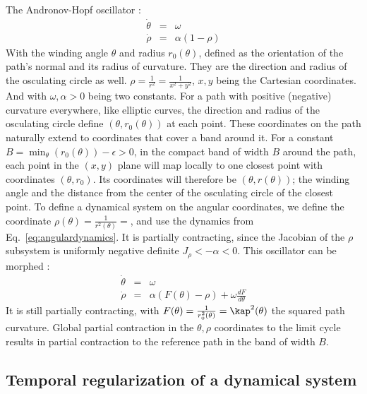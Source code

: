 The Andronov-Hopf oscillator \cite{park2009design}:
\begin{eqnarray}
\label{eq:angulardynamics}
\dot{\theta} &=& \omega\\ \nonumber
\dot{\rho} &=& \alpha(1-\rho)
\end{eqnarray}
With the winding angle $\theta$ and radius $r_0(\theta)$, defined as the orientation of the path's normal and its radius of curvature.
They are the direction and radius of the osculating circle as well.
$\rho=\frac{1}{r^2}=\frac{1}{x^2+y^2}$, $x,y$ being the Cartesian coordinates.
And with $\omega,\alpha>0$ being two constants.
For a path with positive (negative) curvature everywhere, like elliptic curves, the direction and radius of the osculating circle define $(\theta,r_0(\theta))$ at each point.
These coordinates on the path naturally extend to coordinates that cover a band around it.
For a constant $B = \min_\theta(r_0(\theta))-\epsilon>0$, in the compact band of width $B$ around the path, each point in the $(x,y)$ plane will map locally to one closest point with coordinates $(\theta,r_0)$.
Its coordinates will therefore be $(\theta,r(\theta))$; the winding angle and the distance from the center of the osculating circle of the closest point. 
To define a dynamical system on the angular coordinates, we define the coordinate $\rho(\theta) = \frac{1}{r^2(\theta)}=$, and use the dynamics from Eq.~\ref{eq:angulardynamics}.
It is partially contracting, since the Jacobian of the $\rho$ subsystem is uniformly negative definite $J_\rho<-\alpha<0$. 
This oscillator can be morphed \cite{ajallooeian_general_2013}:
\begin{eqnarray}
\label{eq:polarmorphingdynamics}
\dot{\theta} &=& \omega\\ \nonumber
\dot{\rho} &=& \alpha (F(\theta)-\rho) + \omega \frac{d F}{d \theta}
\end{eqnarray}
It is still partially contracting, with $F(\theta) = \frac{1}{r_0^2(\theta)} = \kap^2(\theta)$ the squared path curvature.
Global partial contraction in the $\theta,\rho$ coordinates to the limit cycle results in partial contraction to the reference path in the band of width $B$.


\subsection{Temporal regularization of a dynamical system}

